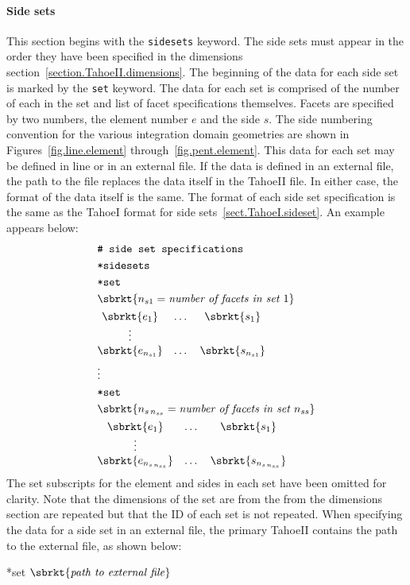 \paragraph{Side sets}
This section begins with the \texttt{sidesets} keyword.
The side sets must appear in the order they have been specified in 
the dimensions section~\ref{section.TahoeII.dimensions}. The 
beginning of the data for each side set is marked by the \texttt{set} 
keyword. The data for each set is comprised of the number of each in 
the set and list of facet specifications themselves. 
Facets are specified by two numbers, the element number $e$ and the
side $s$. The side numbering convention for the various integration 
domain geometries are shown in Figures~\ref{fig.line.element} 
through~\ref{fig.pent.element}.
This data for each set may be 
defined in line or in an external file. If the data is defined in an 
external file, the path to the file replaces the data itself in the 
TahoeII file. In either case, the format of the data itself is the 
same. The format of each side set specification is the same as the TahoeI 
format for side sets~\ref{sect.TahoeI.sideset}. An example appears 
below:
\begin{align}
& \texttt{\# side set specifications} \notag \\
& \texttt{*sidesets} \notag \\
& \texttt{*set} \notag \\
& \sbrkt{n_{s1} = \textit{number of facets in set~}1} \notag \\
& \begin{matrix}
\sbrkt{e_{1}} & \dots  & \sbrkt{s_{1}} \\
\vdots \\
\sbrkt{e_{n_{s1}}} & \dots  & \sbrkt{s_{n_{s1}}}
\end{matrix} \notag \\
& \vdots \notag \\
& \texttt{*set} \notag \\
& \sbrkt{n_{s\,n_{ss}} = \textit{number of facets in set~}n_{ss}} \notag \\
& \begin{matrix}
\sbrkt{e_{1}} & \dots  & \sbrkt{s_{1}} \\
\vdots \\
\sbrkt{e_{n_{s\,n_{ss}}}} & \dots  & \sbrkt{s_{n_{s\,n_{ss}}}}
\end{matrix} \notag
\end{align}
The set subscripts for the element and sides in each set have been
omitted for clarity.
Note that the dimensions of the set are from the from the dimensions 
section are repeated but that the ID of each set is not repeated.
When specifying the data for a side set in an external file, the 
primary TahoeII contains the path to the external file, as shown below:
\begin{inputfile}
*set \(\sbrkt{\textrm{\textit{path to external file}}}\)
\end{inputfile}

